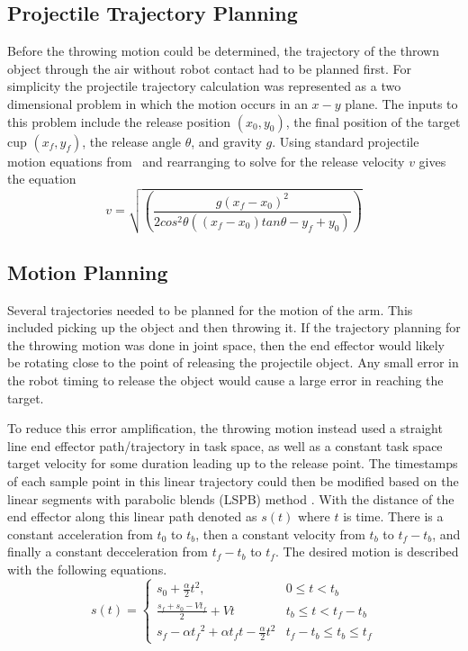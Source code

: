 \documentclass[conference]{IEEEtran}
\begin{document}
\subsection{Projectile Trajectory Planning}
Before the throwing motion could be determined, the trajectory of the thrown
object through the air without robot contact had to be planned first. For
simplicity the projectile trajectory calculation was represented as a two
dimensional problem in which the motion occurs in an $x-y$ plane. The inputs to
this problem include the release position $(x_0, y_0)$, the final position of
the target cup $(x_f, y_f)$, the release angle $\theta$, and gravity $g$. Using
standard projectile motion equations from~\cite{william25} and rearranging to
solve for the release velocity $v$ gives the equation
\begin{equation*}
  v = \sqrt{ \left(\frac{g(x_f-x_0)^2}{2 cos^2\theta ((x_f-x_0) tan \theta - y_f + y_0)} \right ) }
\end{equation*}

\subsection{Motion Planning}
Several trajectories needed to be planned for the motion of the arm. This
included picking up the object and then throwing it. If the trajectory planning
for the throwing motion was done in joint space, then the end effector would
likely be rotating close to the point of releasing the projectile object. Any
small error in the robot timing to release the object would cause a large error
in reaching the target.

To reduce this error amplification, the throwing motion instead used a straight
line end effector path/trajectory in task space, as well as a constant task
space target velocity for some duration leading up to the release point. The
timestamps of each sample point in this linear trajectory could then be modified
based on the linear segments with parabolic blends (LSPB) method
\cite{mark2020control}. With the distance of the end effector along this linear
path denoted as $s(t)$ where $t$ is time. There is a constant acceleration from
$t_0$ to $t_b$, then a constant velocity from $t_b$ to $t_f-t_b$, and finally a
constant decceleration from $t_f-t_b$ to $t_f$. The desired motion is described
with the following equations.
\begin{equation*}
  s(t) =
  \begin{cases}
    s_0+\frac{\alpha}{2}t^2, & 0 \leq t < t_b \\
    \frac{s_f+s_0-Vt_f}{2} + Vt & t_b \leq t < t_f-t_b \\
    s_f-\alpha {t_f}^2+\alpha t_f t-\frac{\alpha}{2} t^2 & t_f-t_b \leq t_b \leq t_f
  \end{cases}
\end{equation*}
\end{document}
